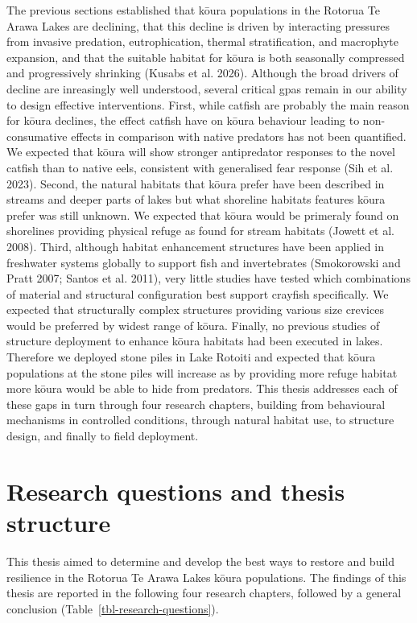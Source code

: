 \documentclass[
  12pt,
  a4paper,
]{scrbook}
\begin{document}
The previous sections established that kōura populations in the Rotorua
Te Arawa Lakes are declining, that this decline is driven by interacting
pressures from invasive predation, eutrophication, thermal
stratification, and macrophyte expansion, and that the suitable habitat
for kōura is both seasonally compressed and progressively shrinking
(Kusabs et al. 2026). Although the broad drivers of decline are
inreasingly well understood, several critical gpas remain in our ability
to design effective interventions. First, while catfish are probably the
main reason for kōura declines, the effect catfish have on kōura
behaviour leading to non-consumative effects in comparison with native
predators has not been quantified. We expected that kōura will show
stronger antipredator responses to the novel catfish than to native
eels, consistent with generalised fear response (Sih et al. 2023).
Second, the natural habitats that kōura prefer have been described in
streams and deeper parts of lakes but what shoreline habitats features
kōura prefer was still unknown. We expected that kōura would be
primeraly found on shorelines providing physical refuge as found for
stream habitats (Jowett et al. 2008). Third, although habitat
enhancement structures have been applied in freshwater systems globally
to support fish and invertebrates (Smokorowski and Pratt 2007; Santos et
al. 2011), very little studies have tested which combinations of
material and structural configuration best support crayfish
specifically. We expected that structurally complex structures providing
various size crevices would be preferred by widest range of kōura.
Finally, no previous studies of structure deployment to enhance kōura
habitats had been executed in lakes. Therefore we deployed stone piles
in Lake Rotoiti and expected that kōura populations at the stone piles
will increase as by providing more refuge habitat more kōura would be
able to hide from predators. This thesis addresses each of these gaps in
turn through four research chapters, building from behavioural
mechanisms in controlled conditions, through natural habitat use, to
structure design, and finally to field deployment.

\section{Research questions and thesis
structure}\label{research-questions-and-thesis-structure}

This thesis aimed to determine and develop the best ways to restore and
build resilience in the Rotorua Te Arawa Lakes kōura populations. The
findings of this thesis are reported in the following four research
chapters, followed by a general conclusion
(Table~\ref{tbl-research-questions}).
\end{document}
